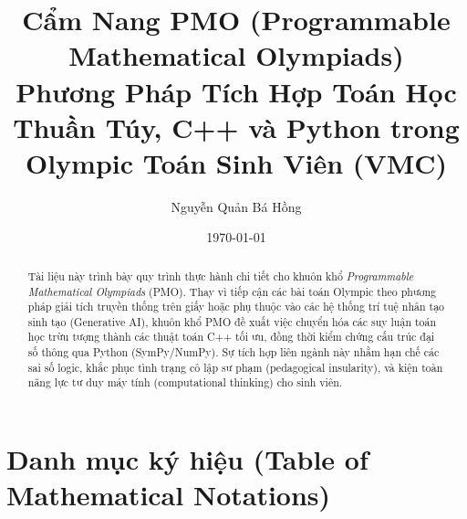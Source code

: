 \documentclass{article}
\title{Cẩm Nang PMO (Programmable Mathematical Olympiads)\\ Phương Pháp Tích Hợp Toán Học Thuần Túy, C++ và Python trong Olympic Toán Sinh Viên (VMC)}
\author{Nguyễn Quản Bá Hồng}
\date{\today}
\begin{document}
\maketitle

\begin{abstract}
Tài liệu này trình bày quy trình thực hành chi tiết cho khuôn khổ \textit{Programmable Mathematical Olympiads} (PMO). Thay vì tiếp cận các bài toán Olympic theo phương pháp giải tích truyền thống trên giấy hoặc phụ thuộc vào các hệ thống trí tuệ nhân tạo sinh tạo (Generative AI), khuôn khổ PMO đề xuất việc chuyển hóa các suy luận toán học trừu tượng thành các thuật toán C++ tối ưu, đồng thời kiểm chứng cấu trúc đại số thông qua Python (\textsf{SymPy/NumPy}). Sự tích hợp liên ngành này nhằm hạn chế các sai số logic, khắc phục tình trạng cô lập sư phạm (pedagogical insularity), và kiện toàn năng lực tư duy máy tính (computational thinking) cho sinh viên.
\end{abstract}

\tableofcontents


\section*{Danh mục ký hiệu (Table of Mathematical Notations)}
\end{document}
